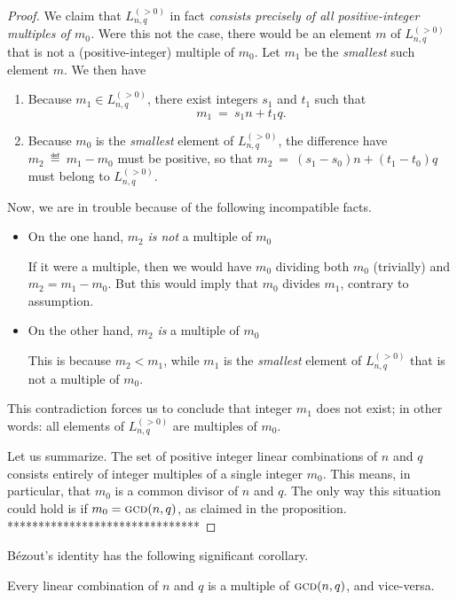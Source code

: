 \begin{proof}
{We claim that $L^{(>0)}_{n,q}$ in fact {\em consists precisely of all positive-integer multiples of $m_0$.}  Were this not the case, there would be an element $m$ of $L^{(>0)}_{n,q}$ that is not a (positive-integer) multiple of $m_0$.  Let $m_1$ be the {\em smallest} such element $m$.  We then have
\begin{enumerate}
\item
Because $m_1 \in L^{(>0)}_{n,q}$, there exist integers $s_1$ and $t_1$ such that
\[  m_1 \ = \ s_1 n + t_1 q. \]
\item
Because $m_0$ is the {\em smallest} element of $L^{(>0)}_{n,q}$, the difference have $m_2 \ \eqdef \ m_1 - m_0$ must be positive, so that $m_2 \ = \ (s_1 - s_0) n + (t_1 -t_0) q$ must belong to $L^{(>0)}_{n,q}$.
\end{enumerate}
Now, we are in trouble because of the following incompatible facts.
\begin{itemize}
\item
On the one hand, $m_2$ {\em is not} a multiple of $m_0$

\smallskip

If it were a multiple, then we would have $m_0$ dividing both $m_0$ (trivially) and $m_2 = m_1 - m_0$.  But this would imply that $m_0$ divides $m_1$, contrary to assumption.

\medskip\item
On the other hand, $m_2$ {\em is} a multiple of $m_0$

\smallskip

This is because $m_2 < m_1$, while $m_1$ is the {\em smallest} element of $L^{(>0)}_{n,q}$ that is not a multiple of $m_0$.
\end{itemize}
This contradiction forces us to conclude that integer $m_1$ does not exist; in other words: all elements of $L^{(>0)}_{n,q}$ are multiples of $m_0$.

Let us summarize.  The set of positive integer linear combinations of $n$ and $q$ consists entirely of integer multiples of a single integer $m_0$.  This means, in particular, that $m_0$ is a common divisor of $n$ and $q$.  The only way this situation could hold is if $m_0 = \mbox{\sc gcd}(n,q)$, as claimed in the proposition.  
*******************************}

\end{proof}

\noindent
B\'{e}zout's identity has the following significant corollary.

\begin{corol}
Every linear combination of $n$ and $q$ is a multiple of $\mbox{\sc gcd}(n,q)$, and vice-versa.
\end{corol}

